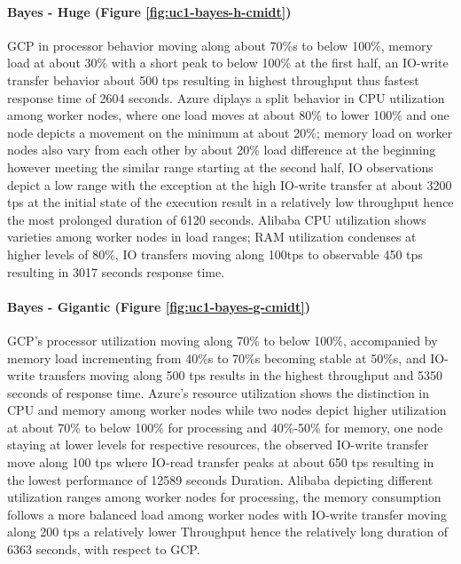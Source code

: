 \documentclass[review]{elsarticle}
\begin{document}
\paragraph{Bayes - Huge (Figure \ref{fig:uc1-bayes-h-cmidt})}GCP in processor behavior moving along about 70\%s to below 100\%, memory load at about 30\% with a short peak to below 100\% at the first half, an IO-write transfer behavior about 500 tps resulting in highest throughput thus fastest response time of 2604 seconds. Azure diplays a split behavior in CPU utilization among worker nodes, where one load moves at about 80\% to lower 100\% and one node depicts a movement on the minimum at about 20\%; memory load on worker nodes also vary from each other by about 20\% load difference at the beginning however meeting the similar range starting at the second half, IO observations depict a low range with the exception at the high IO-write transfer at about 3200 tps at the initial state of the execution result in a relatively low throughput hence the most prolonged duration of 6120 seconds. Alibaba CPU utilization shows varieties among worker nodes in load ranges; RAM utilization condenses at higher levels of 80\%, IO transfers moving along 100tps to observable 450 tps resulting in 3017 seconds response time.

\paragraph{Bayes - Gigantic (Figure \ref{fig:uc1-bayes-g-cmidt})}GCP's processor utilization moving along 70\% to below 100\%, accompanied by memory load incrementing from 40\%s to 70\%s becoming stable at 50\%s, and IO-write transfers moving along 500 tps results in the highest throughput and 5350 seconds of response time. Azure's resource utilization shows the distinction in CPU and memory among worker nodes while two nodes depict higher utilization at about 70\% to below 100\% for processing and 40\%-50\% for memory, one node staying at lower levels for respective resources, the observed IO-write transfer move along 100 tps where IO-read transfer peaks at about 650 tps resulting in the lowest performance of 12589 seconds Duration. Alibaba depicting different utilization ranges among worker nodes for processing, the memory consumption follows a more balanced load among worker nodes with IO-write transfer moving along 200 tps a relatively lower Throughput hence the relatively long duration of 6363 seconds, with respect to GCP.
\end{document}
